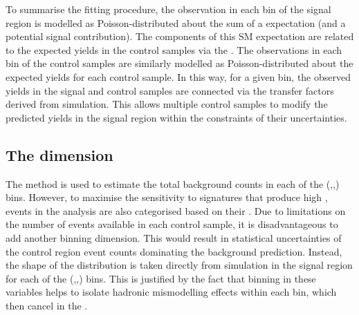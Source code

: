 To summarise the fitting procedure, the observation in each bin of the
signal region is modelled as Poisson-distributed about the sum of a
\SM expectation (and a potential signal contribution). The components
of this SM expectation are related to the expected yields in the
control samples via the \TFs. The observations in each bin of the
control samples are similarly modelled as Poisson-distributed about
the expected yields for each control sample. In this way, for a given
bin, the observed yields in the signal and control samples are
connected via the transfer factors derived from simulation.  This
allows multiple control samples to modify the predicted yields in the
signal region within the constraints of their uncertainties.

\subsection{The \MHT dimension}
\label{sec:mhtDim}

The \TF method is used to estimate the total background counts in each
of the (\HT,\nj,\nb) bins. However, to maximise the sensitivity to
\BSM signatures that produce high \MET, events in the analysis are also
categorised based on their \MHT. Due to limitations on the
number of events available in each control sample, it is
disadvantageous to add another binning
dimension. This would result in statistical uncertainties of the
control region event counts dominating the background prediction.
Instead, the shape of the \MHT distribution is taken directly from
simulation in the signal region for each of the (\HT,\nj,\nb) bins.
This is justified by the fact that binning in these variables helps to
isolate hadronic mismodelling effects within each bin, which then
cancel in the \TFs. 


